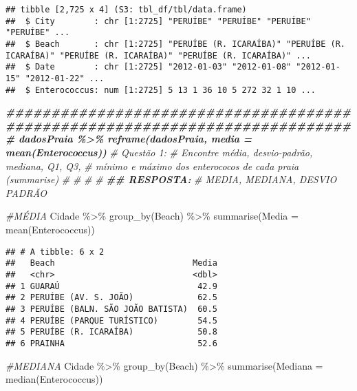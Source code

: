 \documentclass[
]{article}
\newenvironment{Shaded}{\begin{snugshade}}{\end{snugshade}}
\newcommand{\AttributeTok}[1]{\textcolor[rgb]{0.77,0.63,0.00}{#1}}
\newcommand{\CommentTok}[1]{\textcolor[rgb]{0.56,0.35,0.01}{\textit{#1}}}
\newcommand{\DocumentationTok}[1]{\textcolor[rgb]{0.56,0.35,0.01}{\textbf{\textit{#1}}}}
\newcommand{\FunctionTok}[1]{\textcolor[rgb]{0.00,0.00,0.00}{#1}}
\newcommand{\NormalTok}[1]{#1}
\newcommand{\SpecialCharTok}[1]{\textcolor[rgb]{0.00,0.00,0.00}{#1}}
\begin{document}
\begin{verbatim}
## tibble [2,725 x 4] (S3: tbl_df/tbl/data.frame)
##  $ City        : chr [1:2725] "PERUÍBE" "PERUÍBE" "PERUÍBE" "PERUÍBE" ...
##  $ Beach       : chr [1:2725] "PERUÍBE (R. ICARAÍBA)" "PERUÍBE (R. ICARAÍBA)" "PERUÍBE (R. ICARAÍBA)" "PERUÍBE (R. ICARAÍBA)" ...
##  $ Date        : chr [1:2725] "2012-01-03" "2012-01-08" "2012-01-15" "2012-01-22" ...
##  $ Enterococcus: num [1:2725] 5 13 1 36 10 5 272 32 1 10 ...
\end{verbatim}

\begin{Shaded}
\begin{Highlighting}[]
\DocumentationTok{\#\#\#\#\#\#\#\#\#\#\#\#\#\#\#\#\#\#\#\#\#\#\#\#\#\#\#\#\#\#\#\#\#\#\#\#\#\#\#\#\#\#\#\#\#\#\#\#\#\#\#\#\#\#\#\#\#\#\#\#\#\#\#\#\#\#\#\#\#\#\#\#\#\#\#\#\# dadosPraia \%\textgreater{}\% reframe(dadosPraia, media = mean(Enterococcus))}
\CommentTok{\# Questão 1:}
\CommentTok{\#   Encontre média, desvio{-}padrão, mediana, Q1, Q3, }
\CommentTok{\#   mínimo e máximo dos enterococos de cada praia (summarise)}
\CommentTok{\#}
\CommentTok{\#}
\CommentTok{\#}
\CommentTok{\# }
\DocumentationTok{\#\# RESPOSTA: }
\CommentTok{\# MEDIA, MEDIANA, DESVIO PADRÃO}


\CommentTok{\#MÉDIA}
\NormalTok{Cidade }\SpecialCharTok{\%\textgreater{}\%} \FunctionTok{group\_by}\NormalTok{(Beach) }\SpecialCharTok{\%\textgreater{}\%} \FunctionTok{summarise}\NormalTok{(}\AttributeTok{Media =} \FunctionTok{mean}\NormalTok{(Enterococcus))}
\end{Highlighting}
\end{Shaded}

\begin{verbatim}
## # A tibble: 6 x 2
##   Beach                            Media
##   <chr>                            <dbl>
## 1 GUARAÚ                            42.9
## 2 PERUÍBE (AV. S. JOÃO)             62.5
## 3 PERUÍBE (BALN. SÃO JOÃO BATISTA)  60.5
## 4 PERUÍBE (PARQUE TURÍSTICO)        54.5
## 5 PERUÍBE (R. ICARAÍBA)             50.8
## 6 PRAINHA                           52.6
\end{verbatim}

\begin{Shaded}
\begin{Highlighting}[]
\CommentTok{\#MEDIANA}
\NormalTok{Cidade }\SpecialCharTok{\%\textgreater{}\%} \FunctionTok{group\_by}\NormalTok{(Beach) }\SpecialCharTok{\%\textgreater{}\%} \FunctionTok{summarise}\NormalTok{(}\AttributeTok{Mediana =} \FunctionTok{median}\NormalTok{(Enterococcus))}
\end{Highlighting}
\end{Shaded}
\end{document}

